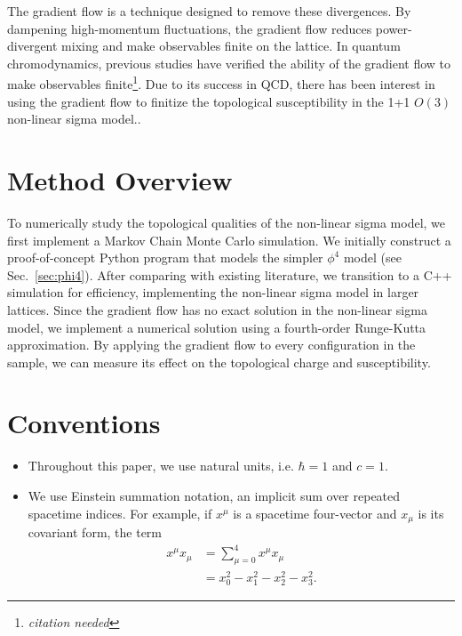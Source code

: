 \documentclass[12pt]{report}
\newcommand{\citeneeded}{\footnote{\textit{citation needed}}}
\begin{document}
The gradient flow is a technique designed to remove these divergences. By dampening high-momentum fluctuations, the gradient flow reduces power-divergent mixing and make observables finite on the lattice.\cite{monahan2016} In quantum chromodynamics, previous studies have verified the ability of the gradient flow to make observables finite\citeneeded. Due to its success in QCD, there has been interest in using the gradient flow to finitize the topological susceptibility in the 1+1 $O(3)$ non-linear sigma model.\cite{bietenholz2018}.


\section{Method Overview}

To numerically study the topological qualities of the non-linear sigma model, we first implement a Markov Chain Monte Carlo simulation. We initially construct a proof-of-concept Python program that models the simpler $\phi^4$ model (see Sec.~\ref{sec:phi4}). After comparing with existing literature, we transition to a C++ simulation for efficiency, implementing the non-linear sigma model in larger lattices. Since the gradient flow has no exact solution in the non-linear sigma model, we implement a numerical solution using a fourth-order Runge-Kutta approximation. By applying the gradient flow to every configuration in the sample, we can measure its effect on the topological charge and susceptibility.

\section{Conventions}
\begin{itemize}
    \item Throughout this paper, we use natural units, i.e. $\hbar = 1$ and $c=1$.
    \item We use Einstein summation notation, an implicit sum over repeated spacetime indices. For example, if $x^\mu$ is a spacetime four-vector and $x_\mu$ is its covariant form, the term
        \begin{align*}
            x^\mu x_\mu &= \sum^4_{\mu=0} x^\mu x_\mu \\
            &= x_0^2-x_1^2-x_2^2-x_3^2.
        \end{align*}
\end{itemize}

\end{document}
